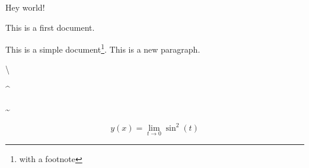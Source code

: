 \documentclass{article}
\begin{document}
Hey world!

This is a first document.

This is a simple
document\footnote{with a footnote}.
This is a new paragraph.

\textbraceleft

\textbraceright

\textdollar

\textunderscore

\textbackslash

\textasciicircum

\textasciitilde

\begin{equation}\label{eq:eq01}
  y(x) = \lim_{t \to 0} \sin^2(t)
\end{equation}
\end{document}

